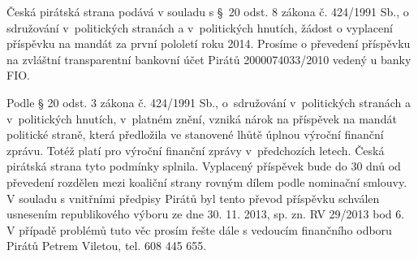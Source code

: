 \documentclass[11pt,a4paper,czech]{article}
\begin{document}


\def \yoursign {}
\def \yourdate {}
\def \oursign {RP 32/2012}
\def \place {Praha}

\printheader

\subject{Žádost o vyplacení příspěvku na mandát}



Česká pirátská strana podává v souladu s §~20 odst. 8 zákona č. 424/1991 Sb., o sdružování v~politických stranách a v~politických hnutích, žádost o vyplacení příspěvku na mandát za první pololetí roku 2014. Prosíme o převedení příspěvku na zvláštní transparentní bankovní účet Pirátů 2000074033/2010 vedený u banky FIO. 

\reasons

Podle § 20 odst. 3 zákona č. 424/1991 Sb., o~sdružování v~politických stranách a v~politických hnutích, v~platném znění, vzniká nárok na příspěvek na mandát politické  straně, která předložila ve stanovené lhůtě úplnou výroční finanční zprávu. Totéž platí pro výroční finanční zprávy v~předchozích letech. Česká pirátská strana tyto podmínky splnila. Vyplacený příspěvek bude do 30 dnů od převedení rozdělen mezi koaliční strany rovným dílem podle nominační smlouvy. V souladu s vnitřními předpisy Pirátů byl tento převod příspěvku schválen usnesením republikového výboru ze dne 30. 11. 2013, sp. zn. RV 29/2013 bod 6. V případě problémů tuto věc prosím řešte dále s vedoucím finančního odboru Pirátů Petrem Viletou, tel. 608 445 655. 

 

\signature{S pozdravem

\vspace{1.1cm}

PhDr. Ivan Bartoš, Ph.D. \\ předseda Pirátů}
\end{document}
